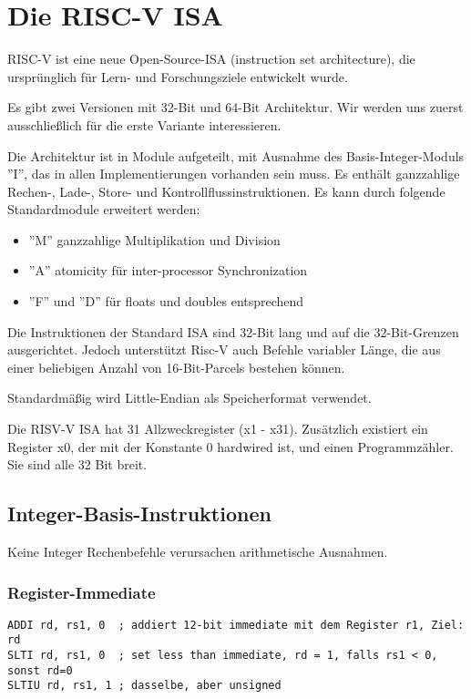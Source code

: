 \section{Die RISC-V ISA}

RISC-V ist eine neue Open-Source-ISA (instruction set architecture), die
ursprünglich für Lern- und Forschungsziele entwickelt wurde.

Es gibt zwei Versionen mit 32-Bit und 64-Bit Architektur. Wir werden uns
zuerst ausschließlich für die erste Variante interessieren.

Die Architektur ist in Module aufgeteilt, mit Ausnahme des Basis-Integer-Moduls ''I'', %
das in allen Implementierungen vorhanden sein muss. Es enthält ganzzahlige
Rechen-, Lade-, Store- und Kontrollflussinstruktionen. Es kann durch folgende
Standardmodule erweitert werden:

\begin{itemize}
\item ''M'' ganzzahlige Multiplikation und Division
\item ''A'' atomicity für inter-processor Synchronization
\item ''F'' und ''D'' für floats und doubles entsprechend
\end{itemize}

Die Instruktionen der Standard ISA sind 32-Bit lang und auf die
32-Bit-Grenzen ausgerichtet. Jedoch unterstützt Risc-V auch Befehle variabler Länge, die
aus einer beliebigen Anzahl von 16-Bit-Parcels bestehen können.

Standardmäßig wird Little-Endian als Speicherformat verwendet.

Die RISV-V ISA hat 31 Allzweckregister (x1 - x31). Zusätzlich existiert ein Register x0, der mit der Konstante 0 hardwired ist, und einen Programmzähler. Sie sind alle 32 Bit breit.

\subsection{Integer-Basis-Instruktionen}

Keine Integer Rechenbefehle verursachen arithmetische Ausnahmen.

\subsubsection{Register-Immediate}

\begin{lstlisting}
ADDI rd, rs1, 0  ; addiert 12-bit immediate mit dem Register r1, Ziel: rd
SLTI rd, rs1, 0  ; set less than immediate, rd = 1, falls rs1 < 0, sonst rd=0
SLTIU rd, rs1, 1 ; dasselbe, aber unsigned
\end{lstlisting}

